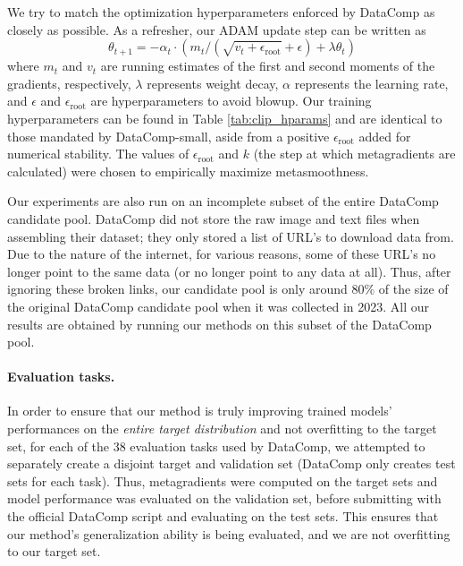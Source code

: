 We try to match the optimization hyperparameters enforced by DataComp as
closely as possible.  As a refresher, our ADAM\cite{kingma2015adam} update step
can be written as
\begin{equation}
	\label{eq:adam_update}
	\theta_{t+1} = -\alpha_t \cdot \left(m_t / \left(\sqrt{v_t +
	\epsilon_\mathrm{root}} + \epsilon\right) + \lambda \theta_t\right)
\end{equation}
where $m_t$ and $v_t$ are running estimates of the first and second moments of
the gradients, respectively, $\lambda$ represents weight decay, $\alpha$
represents the learning rate, and $\epsilon$ and $\epsilon_\mathrm{root}$ are
hyperparameters to avoid blowup.  Our training hyperparameters can be found in
Table \ref{tab:clip_hparams} and are identical to those mandated by
DataComp-small, aside from a positive $\epsilon_\mathrm{root}$ added for
numerical stability. The values of $\epsilon_{\mathrm{root}}$ and $k$ (the step
at which metagradients are calculated) were chosen to empirically maximize
metasmoothness.


\begin{table}[h]
	\caption{Hyperparameters for the CLIP DataComp experiments.}
	\centering
	
	\label{tab:clip_hparams}
\end{table}

Our experiments are also run on an incomplete subset of the entire DataComp
candidate pool.    DataComp did not store the raw image and text files when
assembling their dataset; they only stored a list of URL's to download data
from.  Due to the nature of the internet, for various reasons, some of these
URL's no longer point to the same data (or no longer point to any data at all).
Thus, after ignoring these broken links, our candidate pool is only around
$80\%$ of the size of the original DataComp candidate pool when it was
collected in 2023.  All our results are obtained by running our methods on this
subset of the DataComp pool.

\paragraph{Evaluation tasks.}
In order to ensure that our method is truly improving trained models'
performances on the \emph{entire target distribution} and not overfitting to
the target set, for each of the 38 evaluation tasks used by DataComp, we
attempted to separately create a disjoint target and validation set (DataComp only
creates test sets for each task).  Thus, metagradients were computed on the
target sets and model performance was evaluated on the validation set, before
submitting with the official DataComp script and evaluating on the test sets. 
This ensures that our method's generalization ability is being evaluated, and
we are not overfitting to our target set.

